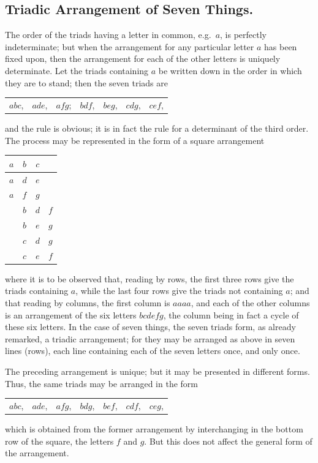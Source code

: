 \documentclass[12pt,a4paper]{article}
\begin{document}
\subsection*{Triadic Arrangement of Seven Things.}

The order of the triads having a letter in common, e.g.\ $a$, is perfectly indeterminate; but when the arrangement for any particular letter $a$ has been fixed upon, then the arrangement for each of the other letters is uniquely determinate. Let the triads containing $a$ be written down in the order in which they are to stand; then the seven triads are
\begin{center}
\begin{tabular}{lllllll}
$abc$, & $ade$, & $afg$; & $bdf$, & $beg$, & $cdg$, & $cef$,
\end{tabular}
\end{center}
and the rule is obvious; it is in fact the rule for a determinant of the third order. The process may be represented in the form of a square arrangement
\begin{center}
\begin{tabular}{|c|c|c|c|}
\hline
$a$ & $b$ & $c$ & \\
\hline
$a$ & $d$ & $e$ & \\
\hline
$a$ & $f$ & $g$ & \\
\hline
   & $b$ & $d$ & $f$ \\
\hline
   & $b$ & $e$ & $g$ \\
\hline
   & $c$ & $d$ & $g$ \\
\hline
   & $c$ & $e$ & $f$ \\
\hline
\end{tabular}
\end{center}
where it is to be observed that, reading by rows, the first three rows give the triads containing $a$, while the last four rows give the triads not containing $a$; and that reading by columns, the first column is $aaaa$, and each of the other columns is an arrangement of the six letters $bcdefg$, the column being in fact a cycle of these six letters. In the case of seven things, the seven triads form, as already remarked, a triadic arrangement; for they may be arranged as above in seven lines (rows), each line containing each of the seven letters once, and only once.

The preceding arrangement is unique; but it may be presented in different forms. Thus, the same triads may be arranged in the form
\begin{center}
\begin{tabular}{lllllll}
$abc$, & $ade$, & $afg$, & $bdg$, & $bef$, & $cdf$, & $ceg$,
\end{tabular}
\end{center}
which is obtained from the former arrangement by interchanging in the bottom row of the square, the letters $f$ and $g$. But this does not affect the general form of the arrangement.
\end{document}
